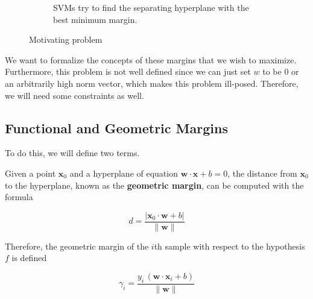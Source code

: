 \begin{example}
\begin{figure}[H]
\begin{subfigure}[b]{0.45\textwidth}
        \caption{SVMs try to find the separating hyperplane with the best minimum margin.} 
        \label{fig:svm_intro2}
      \end{subfigure} 
      \caption{Motivating problem} 
      \label{fig:svm_intro} 
    \end{figure}
  \end{example} 

  We want to formalize the concepts of these margins that we wish to maximize. Furthermore, this problem is not well defined since we can just set $w$ to be $0$ or an arbitrarily high norm vector, which makes this problem ill-posed. Therefore, we will need some constraints as well. 

\subsection{Functional and Geometric Margins} 
  
  To do this, we will define two terms. 

  \begin{definition}
    \label{def:geometric-margin}
    Given a point $\mathbf{x}_0$ and a hyperplane of equation $\mathbf{w} \cdot \mathbf{x} + b = 0$, the distance from $\mathbf{x}_0$ to the hyperplane, known as the \textbf{geometric margin}, can be computed with the formula 

    \begin{equation}
      d = \frac{|\mathbf{x}_0 \cdot \mathbf{w} + b|}{\|\mathbf{w}\|}  
    \end{equation} 

    Therefore, the geometric margin of the $i$th sample with respect to the hypothesis $f$ is defined 

    \begin{equation}
      \gamma_i = \frac{y_i \, (\mathbf{w} \cdot \mathbf{x}_i + b)}{\|\mathbf{w}\|} 
    \end{equation} 
  \end{definition}


